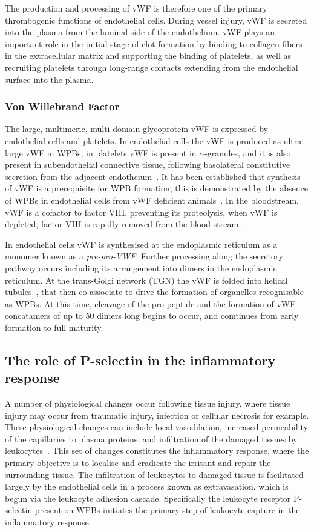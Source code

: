 The production and processing of vWF is therefore one of the primary thrombogenic functions of endothelial cells. During vessel injury, vWF is secreted into the plasma from the luminal side of the endothelium. vWF plays an important role in the initial stage of clot formation by binding to collagen fibers in the extracellular matrix and supporting the binding of platelets, as well as recruiting platelets through long-range contacts extending from the endothelial surface into the plasma.

\subsubsection{Von Willebrand Factor}
The large, multimeric, multi-domain glycoprotein vWF is expressed by endothelial cells and platelets. In endothelial cells the vWF is produced as ultra-large vWF in WPBs, in platelets vWF is present in $\alpha$-granules, and it is also present in  subendothelial connective tissue, following basolateral constitutive secretion from the adjacent endotheium~\cite{Sadler1998}. It has been established that synthesis of vWF is a prerequisite for WPB formation, this is demonstrated by the absence of WPBs in endothelial cells from vWF deficient animals~\cite{Serpe2008}. In the bloodstream, vWF is a cofactor to factor VIII, preventing its proteolysis, when vWF is depleted, factor VIII is rapidly removed from the blood stream~\cite{Sadler1998}.

In endothelial cells vWF is synthesised at the endoplasmic reticulum as a monomer known as a \emph{pre-pro-VWF}. Further processing along the secretory pathway occurs including its arrangement into dimers in the endoplasmic reticulum. At the trans-Golgi network (TGN) the vWF is folded into helical tubules~\cite{Ewenstein1987}, that then co-associate to drive the formation of organelles recognisable as WPBs. At this time, cleavage of the pro-peptide and the formation of vWF concatamers of up to 50 dimers long begins to occur, and comtinues from early formation to full maturity.

\subsection{The role of P-selectin in the inflammatory response}
\label{introduction:endothelial_cellular_biology:p-selectin_inflammatory_cascade}
A number of physiological changes occur following tissue injury, where tissue injury may occur from traumatic injury, infection or cellular necrosis for example. These physiological changes can include local vasodilation, increased permeability of the capillaries to plasma proteins, and infiltration of the damaged tissues by leukocytes~\cite{Hall2011}. This set of changes constitutes the inflammatory response, where the primary objective is to localise and eradicate the irritant and repair the surrounding tissue. The infiltration of leukocytes to damaged tissue is facilitated largely by the endothelial cells in a process known as extravasation, which is begun via the leukocyte adhesion cascade. Specifically the leukocyte receptor P-selectin present on WPBs initiates the primary step of leukocyte capture in the inflammatory response.

